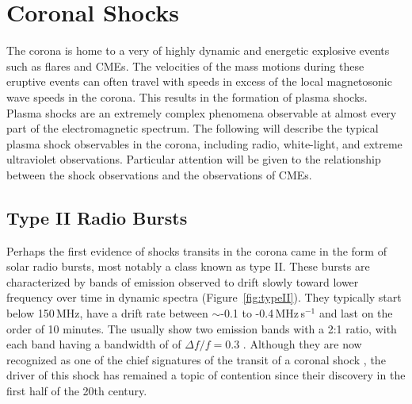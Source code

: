 \section{Coronal Shocks}\label{sec:21}

The corona is home to a very of highly dynamic and energetic explosive events such as flares and CMEs. The velocities of the mass motions during these eruptive events can often travel with speeds in excess of the local magnetosonic wave speeds in the corona. This results in the formation of plasma shocks. Plasma shocks are an extremely complex phenomena observable at almost every part of the electromagnetic spectrum. The following will describe the typical plasma shock observables in the corona, including radio, white-light, and extreme ultraviolet observations. Particular attention will be given to the relationship between the shock observations and the observations of CMEs.

\subsection{Type II Radio Bursts}
Perhaps the first evidence of shocks transits in the corona came in the form of solar radio bursts, most notably a class known as type II. These bursts are characterized by bands of emission observed to drift slowly toward lower frequency over time in dynamic spectra (Figure~\ref{fig:typeII}). They typically start below 150\,MHz, have a drift rate between $\sim$-0.1 to -0.4\,MHz\,s$^{-1}$ and last on the order of 10 minutes.  The usually show two emission bands with a 2:1 ratio, with each band having a bandwidth of of $\Delta f/f=0.3$ \citep{mann1995a}. Although they are now recognized as one of the chief signatures of the transit of a coronal shock \citep{nelson1985, mann1996}, the driver of this shock has remained a topic of contention since their discovery in the first half of the 20th century.

